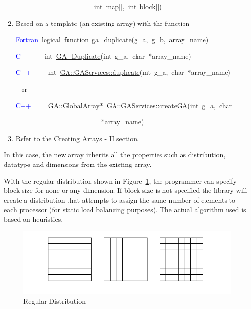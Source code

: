 \begin{enumerate}
\begin{lyxcode}
~~~~~~~~~~~~~~~~~~~~~~~int~map{[}{]},~int~block{[}{]})
\end{lyxcode}
\item Based on a template (an existing array) with the function

\begin{lyxcode}
\textcolor{blue}{Fortran}~logical~function~\href{http://www.emsl.pnl.gov/docs/global/ga_ops.html\#ga_duplicate}{ga\_{}duplicate}(g\_a,~g\_b,~array\_name)~

\textcolor{blue}{C}~~~~~~~int~\href{http://www.emsl.pnl.gov/docs/global/c_nga_ops.html\#ga_duplicate}{GA\_{}Duplicate}(int~g\_a,~char~{*}array\_name)~

\textcolor{blue}{C++}~~~~~int~\href{http://www.emsl.pnl.gov/docs/global/ga++/classGAServices.html\#a17}{GA::GAServices::duplicate}(int~g\_a,~char~{*}array\_name)~

-~or~-~

\textcolor{blue}{C++}~~~~~GA::GlobalArray{*}~GA::GAServices::createGA(int~g\_a,~char

~~~~~~~~~~~~~~~~~~~~~~~~~{*}array\_name)
\end{lyxcode}
\item Refer to the \textquotedbl{}Creating Arrays - II\textquotedbl{} section.
\end{enumerate}
In this case, the new array inherits all the properties such as distribution,
datatype and dimensions from the existing array.

With the regular distribution shown in Figure~\ref{cap:RegularDistribution},
the programmer can specify block size for none or any dimension. If
block size is not specified the library will create a distribution
that attempts to assign the same number of elements to each processor
(for static load balancing purposes). The actual algorithm used is
based on heuristics.

%
\begin{figure}
\begin{centering}
\includegraphics[width=0.9\columnwidth]{distr-1}
\par\end{centering}

\caption{\label{cap:RegularDistribution}Regular Distribution}

\end{figure}


